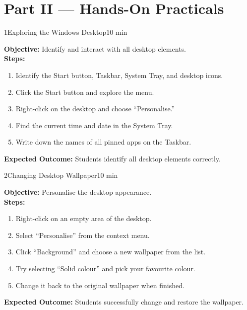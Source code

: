 
\chapter{Part II --- Hands-On Practicals}
\label{ch:lab2}


\begin{labactivity}{1}{Exploring the Windows Desktop}{10 min}

\textbf{Objective:} Identify and interact with all desktop elements.\\[4pt]
\textbf{Steps:}
\begin{enumerate}[label=\protect\stepcircle{\arabic*}, leftmargin=2cm, itemsep=4pt]
  \item Identify the Start button, Taskbar, System Tray, and desktop icons.
  \item Click the Start button and explore the menu.
  \item Right-click on the desktop and choose ``Personalise.''
  \item Find the current time and date in the System Tray.
  \item Write down the names of all pinned apps on the Taskbar.
\end{enumerate}
\textbf{Expected Outcome:} Students identify all desktop elements correctly.
\welldone
\end{labactivity}

\begin{labactivity}{2}{Changing Desktop Wallpaper}{10 min}

\textbf{Objective:} Personalise the desktop appearance.\\[4pt]
\textbf{Steps:}
\begin{enumerate}[label=\protect\stepcircle{\arabic*}, leftmargin=2cm, itemsep=4pt]
  \item Right-click on an empty area of the desktop.
  \item Select ``Personalise'' from the context menu.
  \item Click ``Background'' and choose a new wallpaper from the list.
  \item Try selecting ``Solid colour'' and pick your favourite colour.
  \item Change it back to the original wallpaper when finished.
\end{enumerate}
\textbf{Expected Outcome:} Students successfully change and restore the wallpaper.
\welldone
\end{labactivity}

